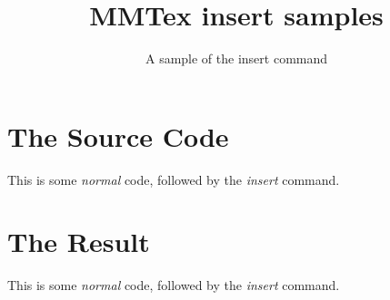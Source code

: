 \documentclass{webpage}
\begin{document}
\title{MMTex insert samples}
\subtitle{A sample of the insert command}


\tableofcontents


\section{The Source Code}
\verbatim
This is some \emph{normal} code, followed by the \emph{insert} command.
\endverbatim

\section{The Result}

This is some \emph{normal} code, followed by the \emph{insert} command.
\end{document}
